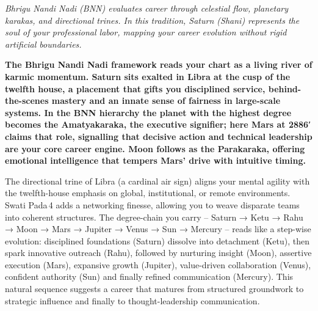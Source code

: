 


{\fontsize{9.5}{14}\selectfont\color{DeepSlate}\itshape Bhrigu Nandi Nadi (BNN) evaluates career through celestial flow, planetary karakas, and directional trines. In this tradition, Saturn (Shani) represents the soul of your professional labor, mapping your career evolution without rigid artificial boundaries.}\par\vspace{3.5mm}

\label{topic32}

{\fontsize{9.5}{13.8}\selectfont\bfseries\color{DeepSlate} The Bhrigu Nandi Nadi framework reads your chart as a living river of karmic momentum. Saturn sits exalted in Libra at the cusp of the twelfth house, a placement that gifts you disciplined service, behind-the-scenes mastery and an innate sense of fairness in large-scale systems. In the BNN hierarchy the planet with the highest degree becomes the Amatyakaraka, the executive signifier; here Mars at 28\textdegree{}86′ claims that role, signalling that decisive action and technical leadership are your core career engine. Moon follows as the Parakaraka, offering emotional intelligence that tempers Mars' drive with intuitive timing.}\par\vspace{2mm}

{\fontsize{9}{13}\selectfont The directional trine of Libra (a cardinal air sign) aligns your mental agility with the twelfth-house emphasis on global, institutional, or remote environments. Swati Pada 4 adds a networking finesse, allowing you to weave disparate teams into coherent structures. The degree-chain you carry -- Saturn → Ketu → Rahu → Moon → Mars → Jupiter → Venus → Sun → Mercury -- reads like a step-wise evolution: disciplined foundations (Saturn) dissolve into detachment (Ketu), then spark innovative outreach (Rahu), followed by nurturing insight (Moon), assertive execution (Mars), expansive growth (Jupiter), value-driven collaboration (Venus), confident authority (Sun) and finally refined communication (Mercury). This natural sequence suggests a career that matures from structured groundwork to strategic influence and finally to thought-leadership communication.}\par\vspace{1.8mm}

